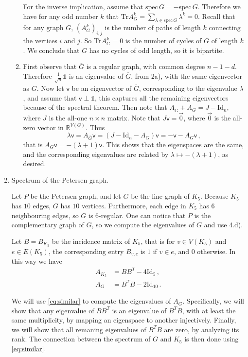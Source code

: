 \documentclass[kulak]{tplt}
\theoremstyle{definition}
\newcommand{\R}{\mathbb{R}}
\newcommand{\vv}{\mathsf{v}}
\newcommand{\Tr}{\mathrm{Tr}}
\newcommand{\Id}{\mathrm{Id}}
\newcommand{\spec}{\mathrm{spec}}
\begin{document}
\begin{enumerate}
\begin{enumerate}
For the inverse implication, assume that $\spec \, G = - \spec \, G$.
Therefore we have for any odd number $k$ that $\Tr A_G^k = \sum_{\lambda \in \spec \, G } \lambda^k = 0$.
Recall that for any graph $G$, $(A_G^k)_{i, j}$ is the number of paths of length $k$ connecting the vertices $i$ and $j$.
So $\Tr A_G^k = 0$ is the number of cycles of $G$ of length $k$.
We conclude that $G$ has no cycles of odd length, so it is bipartite.


\item 
First observe that $\overline{G}$ is a regular graph, with common degree $n - 1 - d $.
Therefore $\frac{1}{\sqrt{n}} \mathbb{1}$ is an eigenvalue of $\overline{G}$, from 2a), with the same eigenvector as $G$.
Now let $\vv $ be an eigenvector of $\overline{G}$, corresponding to the eigenvalue $\lambda$, and assume that $\vv \perp \mathbb{1}$, this captures all the remaining eigenvectors because of the spectral theorem.
Then note that $A_{\overline{G}} + A_G = J - \Id_n$, where $J$ is the all-one $n\times n$ matrix.
Note that $J\vv = \vec{0}$, where $\vec{0}$ is the all-zero vector in $\R^{V(G)}$.
Thus
$$\lambda \vv = A_{\overline{G}}\vv = (J - \Id_n - A_G)\vv = -\vv - A_G \vv\, ,$$
that is $A_G \vv = -(\lambda + 1)\vv$.
This shows that the eigenspaces are the same, and the corresponding eigenvalues are related by $\lambda \mapsto -(\lambda + 1)$, as desired.
\end{enumerate}


\item Spectrum of the Petersen graph.

Let $P$ be the Petersen graph, and let $G$ be the line graph of $K_5$.
Because $K_5$ has $10$ edges, $G$ has $10$ vertices.
Furthermore, each edge in $K_5$ has $6$ neighbouring edges, so $G$ is $6$-regular.
One can notice that $P$ is the complementary graph of $G$, so we compute the eigenvalues of $G$ and use 4.d).

Let $B = B_{K_5}$ be the incidence matrix of $K_5$, that is for $v\in V(K_5)$ and $e\in E(K_5)$, the corresponding entry $B_{v, e}$ is $1$ if $v\in e$, and $0$ otherwise.
In this way we have 
\begin{equation}\label{eq:similar}
\begin{split}
A_{K_5} &= B B^T - 4 \Id_{5} \, , \\
A_G &= B^T B - 2 \Id_{10} \, .
\end{split}
\end{equation}

We will use \eqref{eq:similar} to compute the eigenvalues of $A_G$.
Specifically, we will show that any eigenvalue of $B B^T$ is an eigenvalue of $B^T B$, with at least the same multiplicity, by mapping an eigenspace to another injectively.
Finally, we will show that all remaning eigenvalues of $B^T B$ are zero, by analyzing its rank.
The connection between the spectrum of $G$ and $K_5$ is then done using \eqref{eq:similar}.


\end{enumerate}
\end{document}
